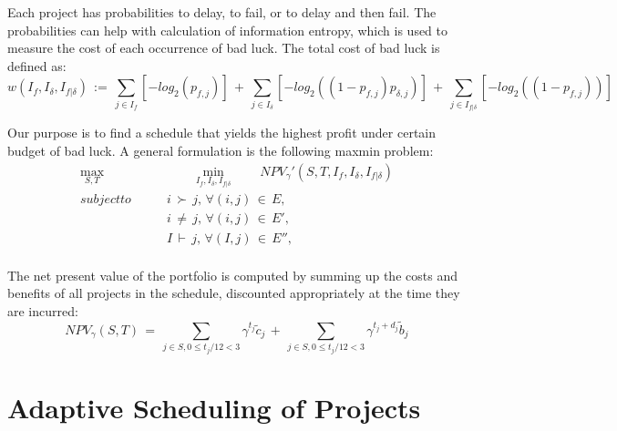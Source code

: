 \documentclass[final,3p,times]{elsarticle}
\begin{document}
Each project has probabilities to delay, to fail, or to delay and then fail. The probabilities can help with calculation of information entropy, which is used to measure the cost of each occurrence of bad luck. The total cost of bad luck is defined as:
\begin{equation*}
	w(I_f, I_{\delta}, I_{f|\delta})\,:=\,\sum_{j\in I_f} [-log_2(p_{f,j})]\,+\,\sum_{j\in I_{\delta}}[-log_2((1-p_{f,j})p_{\delta,j})]\,+\,\sum_{j\in I_{f|\delta}}[-log_2((1-p_{f,j}))]
\end{equation*}

Our purpose is to find a schedule that yields the highest profit under certain budget of bad luck. A general formulation is the following maxmin problem:
\begin{equation}\label{SecondOrProblem}
	\begin{aligned}
		\max_{S,T}&\qquad\min_{I_f, I_{\delta}, I_{f|\delta}}\qquad NPV_{\gamma}'(S,T,I_f, I_{\delta}, I_{f|\delta})\\
		subject to \qquad & i\,\succ\,j,\,\forall (i,j)\,\in\,E,\\
		& i \,\neq \,j, \,\forall (i,j)\,\in\,E',\\
		& I \,\vdash \,j, \,\forall (I,j)\,\in\,E'',\\
	\end{aligned}
\end{equation}

The net present value of the portfolio is computed by summing up the costs and benefits of all projects in the schedule, discounted appropriately at the time they are incurred:
\begin{equation}
	NPV_{\gamma}(S,T)\,=\,\sum_{j\in S, 0\leq t_j/12<3} \gamma^{t_j} \tilde{c}_j\,+\,\sum_{j\in S, 0\leq t_j/12<3} \gamma^{t_j+d_j} \tilde{b}_j
\end{equation}

\section{Adaptive Scheduling of Projects}
\end{document}

